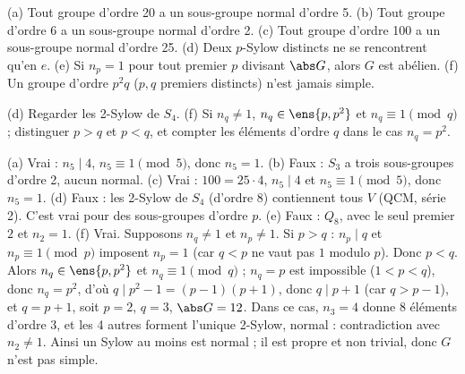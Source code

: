 \begin{exo}
(a) Tout groupe d'ordre 20 a un sous-groupe normal d'ordre 5. (b) Tout groupe d'ordre 6 a un sous-groupe normal d'ordre 2. (c) Tout groupe d'ordre 100 a un sous-groupe normal d'ordre 25. (d) Deux $p$-Sylow distincts ne se rencontrent qu'en $e$. (e) Si $n_p=1$ pour tout premier $p$ divisant $\abs G$, alors $G$ est abélien. (f) Un groupe d'ordre $p^2q$ ($p,q$ premiers distincts) n'est jamais simple.
\begin{indication}
(d) Regarder les 2-Sylow de $S_4$. (f) Si $n_q\neq1$, $n_q\in\ens{p,p^2}$ et $n_q\equiv1\pmod q$ ; distinguer $p>q$ et $p<q$, et compter les éléments d'ordre $q$ dans le cas $n_q=p^2$.
\end{indication}
\begin{corrige}
(a) Vrai : $n_5\mid4$, $n_5\equiv1\pmod5$, donc $n_5=1$.
(b) Faux : $S_3$ a trois sous-groupes d'ordre 2, aucun normal.
(c) Vrai : $100=25\cdot4$, $n_5\mid4$ et $n_5\equiv1\pmod5$, donc $n_5=1$.
(d) Faux : les 2-Sylow de $S_4$ (d'ordre 8) contiennent tous $V$ (QCM, série 2). C'est vrai pour des sous-groupes d'ordre $p$.
(e) Faux : $Q_8$, avec le seul premier $2$ et $n_2=1$.
(f) Vrai. Supposons $n_q\neq1$ et $n_p\neq1$. Si $p>q$ : $n_p\mid q$ et $n_p\equiv1\pmod p$ imposent $n_p=1$ (car $q<p$ ne vaut pas $1$ modulo $p$). Donc $p<q$. Alors $n_q\in\ens{p,p^2}$ et $n_q\equiv1\pmod q$ ; $n_q=p$ est impossible ($1<p<q$), donc $n_q=p^2$, d'où $q\mid p^2-1=(p-1)(p+1)$, donc $q\mid p+1$ (car $q>p-1$), et $q=p+1$, soit $p=2$, $q=3$, $\abs G=12$. Dans ce cas, $n_3=4$ donne 8 éléments d'ordre 3, et les 4 autres forment l'unique 2-Sylow, normal : contradiction avec $n_2\neq1$. Ainsi un Sylow au moins est normal ; il est propre et non trivial, donc $G$ n'est pas simple.
\end{corrige}
\end{exo}

